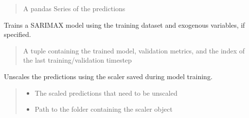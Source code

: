 \documentclass[letterpaper,10pt,english]{sphinxmanual}
\begin{document}
\begin{fulllineitems}
\begin{fulllineitems}
\begin{quote}
\begin{description}
\sphinxAtStartPar
A pandas Series of the predictions

\end{description}\end{quote}

\end{fulllineitems}


\begin{fulllineitems}
\label{\detokenize{docs/SARIMA_model:SARIMA_model.SARIMA_Predictor.train_model}}
\pysigstartsignatures
{}
\pysigstopsignatures
\sphinxAtStartPar
Trains a SARIMAX model using the training dataset and exogenous variables, if specified.
\begin{quote}\begin{description}
\sphinxAtStartPar
A tuple containing the trained model, validation metrics, and the index of the last training/validation timestep

\end{description}\end{quote}

\end{fulllineitems}


\begin{fulllineitems}
\label{\detokenize{docs/SARIMA_model:SARIMA_model.SARIMA_Predictor.unscale_predictions}}
\pysigstartsignatures
{}
\pysigstopsignatures
\sphinxAtStartPar
Unscales the predictions using the scaler saved during model training.
\begin{quote}\begin{description}
\begin{itemize}
\item {} 
\sphinxAtStartPar
{} \textendash{} The scaled predictions that need to be unscaled

\item {} 
\sphinxAtStartPar
{} \textendash{} Path to the folder containing the scaler object

\end{itemize}

\end{description}\end{quote}

\end{fulllineitems}


\end{fulllineitems}
\end{document}
